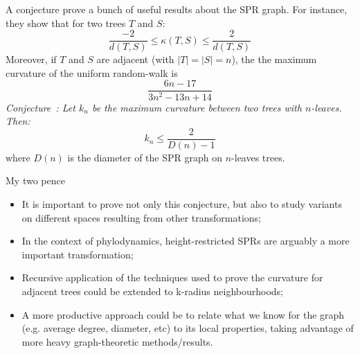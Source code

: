 \begin{frame}{A conjecture}
 \cite{whidden2015} prove a bunch of useful results about the SPR graph.
 For instance, they show that for two trees $T$ and $S$:
 \begin{equation}
 \frac{-2}{d(T,S)} \le \kappa(T,S) \le \frac{2}{d(T,S)}
 \end{equation}
 Moreover, if $T$ and $S$ are adjacent (with $|T| = |S| = n$), the the maximum curvature of the uniform random-walk is 
 \begin{equation}
  \frac{6n-17}{3n^2-13n+14}
 \end{equation}
\textit{Conjecture~\citep{whidden2015}: Let $k_n$ be the maximum curvature between two trees with $n$-leaves.
	Then:
	\begin{equation}
	 k_n \le \frac{2}{D(n)-1}
	\end{equation}
}
where $D(n)$ is the diameter of the SPR graph on $n$-leaves trees.
\end{frame}
\begin{frame}{My two pence}
 \begin{itemize}
  \item It is important to prove not only this conjecture, but also to study variants on different spaces resulting from other transformations;
  \item In the context of phylodynamics, height-restricted SPRs are arguably a more important transformation;
  \item Recursive application of the techniques used to prove the curvature for adjacent trees could be extended to k-radius neighbourhoods;
  \item A more productive approach could be to relate what we know for the graph (e.g. average degree, diameter, etc) to its local properties, taking advantage of more heavy graph-theoretic methods/results.
 \end{itemize}
\end{frame}
